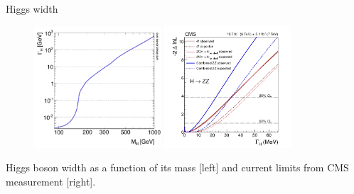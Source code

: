 \begin{frame}{Higgs width}
\vspace{-.2cm}
\begin{figure}[!Hhtbp]
  \begin{center}
    \includegraphics[width=0.42\textwidth]{../figs/u0g5o.png}
    \includegraphics[width=0.42\textwidth]{../figs/AllFitPaper_30_04_14_MeV.png}
  \end{center}
\end{figure}

\vspace{-.2cm}
    \begin{block}{}
      \tiny \centering Higgs boson width as a function of its mass [left] and current limits from CMS measurement [right].
    \end{block}

\end{frame}

%
%
